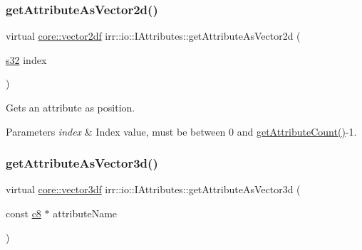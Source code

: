\subsubsection{\texorpdfstring{get\+Attribute\+As\+Vector2d()}{getAttributeAsVector2d()}\hspace{0.1cm}{\footnotesize\ttfamily [4/4]}}
{\footnotesize\ttfamily virtual \hyperlink{namespaceirr_1_1core_a116f90bd31515724b6235014ee2b74d5}{core\+::vector2df} irr\+::io\+::\+I\+Attributes\+::get\+Attribute\+As\+Vector2d (\begin{DoxyParamCaption}\item[{\hyperlink{namespaceirr_ac66849b7a6ed16e30ebede579f9b47c6}{s32}}]{index }\end{DoxyParamCaption})\hspace{0.3cm}{\ttfamily [pure virtual]}}



Gets an attribute as position. 


\begin{DoxyParams}{Parameters}
{\em index} & Index value, must be between 0 and \hyperlink{classirr_1_1io_1_1IAttributes_a796bdd9440ee7ba0b6742a90a82870b6}{get\+Attribute\+Count()}-\/1. \\
\hline
\end{DoxyParams}
\mbox{\label{classirr_1_1io_1_1IAttributes_ac4ad5d4db7fd08e0523d3f8e671c2f68}} 
\subsubsection{\texorpdfstring{get\+Attribute\+As\+Vector3d()}{getAttributeAsVector3d()}\hspace{0.1cm}{\footnotesize\ttfamily [1/4]}}
{\footnotesize\ttfamily virtual \hyperlink{namespaceirr_1_1core_ae6e2b2a6c552833ebbd5b7463d03586b}{core\+::vector3df} irr\+::io\+::\+I\+Attributes\+::get\+Attribute\+As\+Vector3d (\begin{DoxyParamCaption}\item[{const \hyperlink{namespaceirr_a9395eaea339bcb546b319e9c96bf7410}{c8} $\ast$}]{attribute\+Name }\end{DoxyParamCaption})\hspace{0.3cm}{\ttfamily [pure virtual]}}



